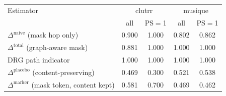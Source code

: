 \begin{tabular}{lcccc}
\toprule
Estimator & \multicolumn{2}{c}{clutrr} & \multicolumn{2}{c}{musique} \\
 & all & PS$=$1 & all & PS$=$1 \\
\midrule
$\Delta^{\text{naive}}$ (mask hop only) & 0.900 & 1.000 & 0.802 & 0.862 \\
$\Delta^{\text{total}}$ (graph-aware mask) & 0.881 & 1.000 & 1.000 & 1.000 \\
DRG path indicator & 1.000 & 1.000 & 1.000 & 1.000 \\
$\Delta^{\text{placebo}}$ (content-preserving) & 0.469 & 0.300 & 0.521 & 0.538 \\
$\Delta^{\text{marker}}$ (mask token, content kept) & 0.581 & 0.700 & 0.469 & 0.462 \\
\bottomrule
\end{tabular}
